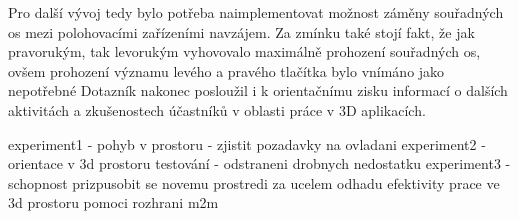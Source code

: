 Pro další vývoj tedy bylo potřeba naimplementovat možnost záměny souřadných os mezi polohovacími zařízeními navzájem. Za zmínku také stojí fakt, že jak pravorukým, tak levorukým vyhovovalo maximálně prohození souřadných os, ovšem prohození významu levého a pravého tlačítka bylo vnímáno jako nepotřebné%
Dotazník nakonec posloužil i k orientačnímu zisku informací o dalších aktivitách a zkušenostech účastníků v oblasti práce v 3D aplikacích.

experiment1 - pohyb v prostoru - zjistit pozadavky na ovladani
experiment2 - orientace v 3d prostoru
testování   - odstraneni drobnych nedostatku
experiment3 - schopnost prizpusobit se novemu prostredi za ucelem odhadu efektivity prace ve 3d prostoru pomoci rozhrani m2m

